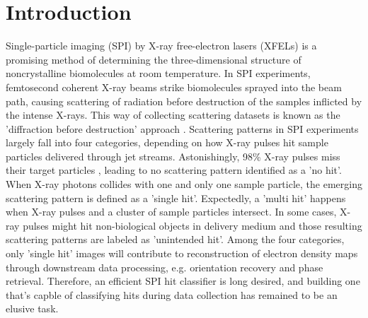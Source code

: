 \section{Introduction}


Single-particle imaging (SPI) by X-ray free-electron lasers (XFELs) is a
promising method of determining the three-dimensional structure of
noncrystalline biomolecules at room temperature.   In SPI experiments,
femtosecond coherent X-ray beams strike biomolecules sprayed into the beam path,
causing scattering of radiation before destruction of the samples inflicted by
the intense X-rays.  This way of collecting scattering datasets is known as the
'diffraction before destruction' approach
\cite{neutzePotentialBiomolecularImaging2000,
chapmanFemtosecondDiffractiveImaging2006,seibertSingleMimivirusParticles2011,
aquilaLinacCoherentLight2015,reddyCoherentSoftXray2017a}.  Scattering patterns
in SPI experiments largely fall into four categories, depending on how X-ray
pulses hit sample particles delivered through jet streams.  Astonishingly, 98\%
X-ray pulses miss their target particles
\cite{shiEvaluationPerformanceClassification2019}, leading to no scattering
pattern identified as a 'no hit'.  When X-ray photons collides with one and only
one sample particle, the emerging scattering pattern is defined as a 'single
hit'. Expectedly, a 'multi hit' happens when X-ray pulses and a cluster of
sample particles intersect. In some cases, X-ray pulses might hit non-biological
objects in delivery medium and those resulting scattering patterns are labeled
as 'unintended hit'.  Among the four categories, only 'single hit' images will
contribute to reconstruction of electron density maps through downstream data
processing, e.g. orientation recovery and phase retrieval.  Therefore, an
efficient SPI hit classifier is long desired, and building one that's capble of
classifying hits during data collection has remained to be an elusive task.


% 

